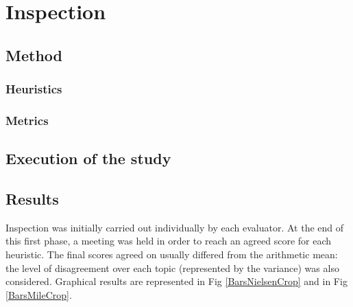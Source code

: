 

\section{Inspection}

\subsection{Method}
\subsubsection{Heuristics}

\subsubsection{Metrics}

\subsection{Execution of the study}

\subsection{Results}
Inspection was initially carried out individually by each evaluator. At the end of this first phase, a meeting was held in order to reach an agreed score for each heuristic. The final scores agreed on usually differed from the arithmetic mean: the level of disagreement over each topic (represented by the variance) was also considered.
Graphical results are represented in Fig \ref{BarsNielsenCrop} and in Fig \ref{BarsMileCrop}.


